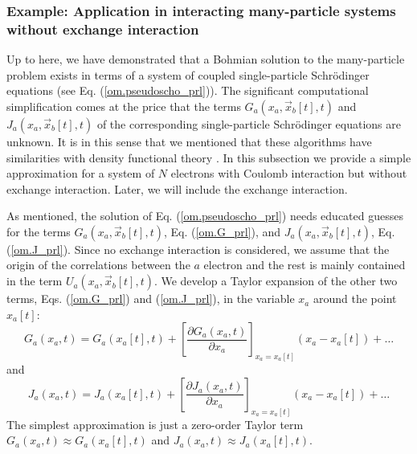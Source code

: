 \documentclass[nofootinbib, secnumarabic, amsmath, nobibnotes,11pt,aps,pra, floatfix]{revtex4-1}
\newcommand{\eref}[1]{Eq. (\ref{#1})}
\begin{document}
\subsubsection{Example: Application in interacting many-particle systems without exchange interaction}

Up to here, we have demonstrated that a Bohmian solution to the
many-particle problem exists in terms of a system of coupled
single-particle Schr\"odinger equations (see
\eref{om.pseudoscho_prl}). The significant computational
simplification comes at the price that the terms
\textit{$G_{a}(x_{a},\vec x_{b}[t],t)$} and
\textit{$J_{a}(x_{a},\vec x_{b}[t],t)$} of the corresponding
single-particle Schr\"odinger equations are unknown. It is in this
sense that we mentioned that these algorithms have similarities with
density functional theory \cite{om.kohn1964,om.kohn1965}. In this
subsection we provide a simple approximation for a system of $N$
electrons with Coulomb interaction but without exchange interaction.
Later, we will include the exchange interaction.

As mentioned, the solution of \eref{om.pseudoscho_prl} needs
educated guesses for the terms \textit{$G_{a}(x_{a},\vec
x_{b}[t],t)$}, \eref{om.G_prl}, and \textit{$J_{a}(x_{a},\vec
x_{b}[t],t)$}, \eref{om.J_prl}. Since no exchange interaction is
considered, we assume that the origin of the correlations between the $a$ electron and the rest is
mainly contained in the term \textit{$U_{a}(x_{a},\vec
x_{b}[t],t)$}. We develop  a Taylor expansion of the other two terms, Eqs.
(\ref{om.G_prl}) and (\ref{om.J_prl}), in the variable $x_a$
around the point $x_a[t]$:
\begin{equation}
\label{om.G_prl_taylor}
G_{a}(x_a,t) = G_{a}(x_a[t],t) + \left[\frac {\partial G_{a}(x_a,t)} {\partial x_a} \right]_{x_a = x_a[t]}(x_a-x_a[t]) + \ldots
\end{equation}
and
\begin{equation}
\label{om.J_prl_taylor}
J_{a}(x_a,t) = J_{a}(x_a[t],t) + \left[\frac {\partial J_{a}(x_a,t)} {\partial x_a}\right]_{x_a = x_a[t]} (x_a-x_a[t]) + \ldots
\end{equation}
The simplest approximation is just a zero-order Taylor term \textit{$G_{a}(x_a,t) \approx G_{a}(x_a[t],t)$} and \textit{$J_{a}(x_a,t) \approx J_{a}(x_a[t],t)$}.
\end{document}
